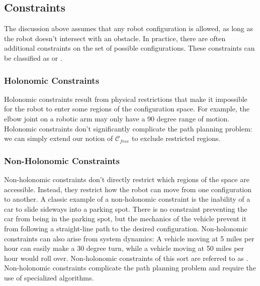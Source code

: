 



\subsection{Constraints}

The discussion above assumes that any robot configuration is allowed,
as long as the robot doesn't intersect with an obstacle. In practice,
there are often additional constraints on the set of possible
configurations. These constraints can be classified as
 or .

\subsubsection{Holonomic Constraints}

Holonomic constraints result from physical restrictions that make it
impossible for the robot to enter some regions of the configuration
space.  For example, the elbow joint on a robotic arm may only have a
90 degree range of motion.  Holonomic constraints don't significantly
complicate the path planning problem: we can simply extend our notion
of $\mathcal{C}_{free}$ to exclude restricted regions.

\subsubsection{Non-Holonomic Constraints}

Non-holonomic constraints don't directly restrict which regions of the
space are accessible. Instead, they restrict how the robot can move
from one configuration to another.  A classic example of a
non-holonomic constraint is the inability of a car to slide sideways
into a parking spot.  There is no constraint preventing the car from
being in the parking spot, but the mechanics of the vehicle prevent it
from following a straight-line path to the desired configuration.
Non-holonomic constraints can also arise from system dynamics: A
vehicle moving at 5 miles per hour can easily make a 30 degree turn,
while a vehicle moving at 50 miles per hour would roll over.
Non-holonomic constraints of this sort are referred to as
.  Non-holonomic constraints
complicate the path planning problem and require the use of
specialized algorithms.


